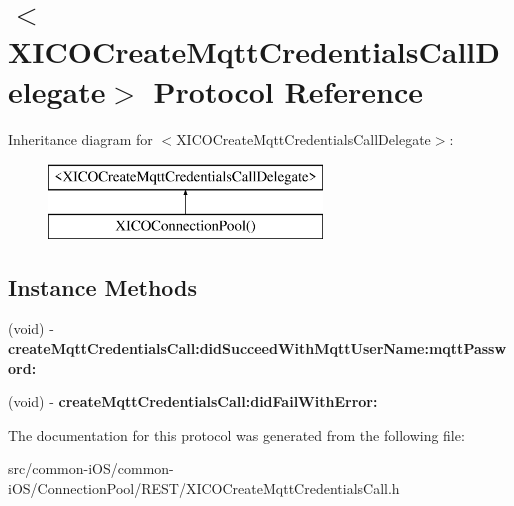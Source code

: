 \hypertarget{protocol_x_i_c_o_create_mqtt_credentials_call_delegate-p}{}\section{$<$X\+I\+C\+O\+Create\+Mqtt\+Credentials\+Call\+Delegate$>$ Protocol Reference}
\label{protocol_x_i_c_o_create_mqtt_credentials_call_delegate-p}
Inheritance diagram for $<$X\+I\+C\+O\+Create\+Mqtt\+Credentials\+Call\+Delegate$>$\+:\begin{figure}[H]
\begin{center}
\leavevmode
\includegraphics[height=2.000000cm]{protocol_x_i_c_o_create_mqtt_credentials_call_delegate-p}
\end{center}
\end{figure}
\subsection*{Instance Methods}
\begin{DoxyCompactItemize}
\item 
\hypertarget{protocol_x_i_c_o_create_mqtt_credentials_call_delegate-p_a281eb779cea525e8c60026f07f53189c}{}\label{protocol_x_i_c_o_create_mqtt_credentials_call_delegate-p_a281eb779cea525e8c60026f07f53189c} 
(void) -\/ {\bfseries create\+Mqtt\+Credentials\+Call\+:did\+Succeed\+With\+Mqtt\+User\+Name\+:mqtt\+Password\+:}
\item 
\hypertarget{protocol_x_i_c_o_create_mqtt_credentials_call_delegate-p_a2cea6433cd1a52ecb9c235f583b7832e}{}\label{protocol_x_i_c_o_create_mqtt_credentials_call_delegate-p_a2cea6433cd1a52ecb9c235f583b7832e} 
(void) -\/ {\bfseries create\+Mqtt\+Credentials\+Call\+:did\+Fail\+With\+Error\+:}
\end{DoxyCompactItemize}


The documentation for this protocol was generated from the following file\+:\begin{DoxyCompactItemize}
\item 
src/common-\/i\+O\+S/common-\/i\+O\+S/\+Connection\+Pool/\+R\+E\+S\+T/X\+I\+C\+O\+Create\+Mqtt\+Credentials\+Call.\+h\end{DoxyCompactItemize}
